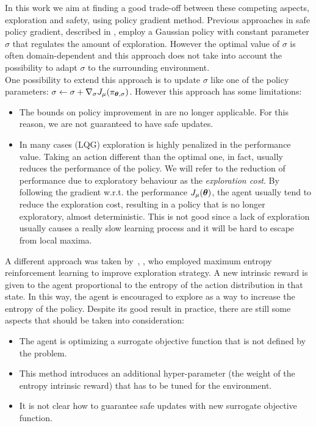 In this work we aim at finding a good trade-off between these competing aspects, exploration and safety, using policy gradient method. Previous approaches in safe policy gradient, described in , employ a Gaussian policy with constant parameter $\sigma$ that regulates the amount of exploration. However the optimal value of $\sigma$ is often domain-dependent and this approach does not take into account the possibility to adapt $\sigma$ to the surrounding environment.\\
One possibility to extend this approach is to update $\sigma$ like one of the policy parameters: $\sigma \gets \sigma + \nabla_\sigma J_\mu(\pi_{{\boldsymbol{\theta}},\sigma})$. However this approach has some limitations:
\begin{itemize}
\item The bounds on policy improvement in \cite{adaptive_step} are no longer applicable. For this reason, we are not guaranteed to have safe updates.
\item In many cases (\eg LQG) exploration is highly penalized in the performance value. Taking an action different than the optimal one, in fact, usually reduces the performance of the policy. We will refer to the reduction of performance due to exploratory behaviour as the \textit{exploration cost}. By following the gradient w.r.t. the performance $J_\mu({\boldsymbol{\theta}})$, the agent usually tend to reduce the exploration cost, resulting in a policy that is no longer exploratory, almost deterministic. This is not good since a lack of exploration usually causes a really slow learning process and it will be hard to escape from local maxima.
\end{itemize}

A different approach was taken by~\cite{haarnoja_reinforcement_2017}, \cite{ziebart_maximum_2008}, \cite{haarnoja2018soft} who employed maximum entropy reinforcement learning to improve exploration strategy. A new intrinsic reward is given to the agent proportional to the entropy of the action distribution in that state. In this way, the agent is encouraged to explore as a way to increase the entropy of the policy. Despite its good result in practice, there are still some aspects that should be taken into consideration:
\begin{itemize}
\item The agent is optimizing a surrogate objective function that is not defined by the problem.
\item This method introduces an additional hyper-parameter (the weight of the entropy intrinsic reward) that has to be tuned for the environment.
\item It is not clear how to guarantee safe updates with new surrogate objective function.
\end{itemize}

